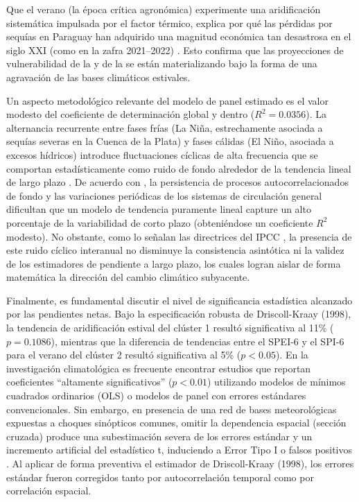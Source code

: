 \documentclass[11pt,a4paper]{article}
\begin{document}
Que el verano (la época crítica agronómica) experimente una aridificación sistemática impulsada por el factor térmico, explica por qué las pérdidas por sequías en Paraguay han adquirido una magnitud económica tan desastrosa en el siglo XXI (como en la zafra 2021--2022) \citep{enciso2022soja}. Esto confirma que las proyecciones de vulnerabilidad de la \citet{cepal2014} y de la \citet{secretaria2017} se están materializando bajo la forma de una agravación de las bases climáticos estivales.

Un aspecto metodológico relevante del modelo de panel estimado es el valor modesto del coeficiente de determinación global y dentro ($R^2 = 0.0356$). La alternancia recurrente entre fases frías (La Niña, estrechamente asociada a sequías severas en la Cuenca de la Plata) y fases cálidas (El Niño, asociada a excesos hídricos) introduce fluctuaciones cíclicas de alta frecuencia que se comportan estadísticamente como ruido de fondo alrededor de la tendencia lineal de largo plazo \citep{penalba2016}. De acuerdo con \citet{mudelsee2010}, la persistencia de procesos autocorrelacionados de fondo y las variaciones periódicas de los sistemas de circulación general dificultan que un modelo de tendencia puramente lineal capture un alto porcentaje de la variabilidad de corto plazo (obteniéndose un coeficiente $R^2$ modesto). No obstante, como lo señalan las directrices del IPCC \citep{stocker_climate_2013}, la presencia de este ruido cíclico interanual no disminuye la consistencia asintótica ni la validez de los estimadores de pendiente a largo plazo, los cuales logran aislar de forma matemática la dirección del cambio climático subyacente.

Finalmente, es fundamental discutir el nivel de significancia estadística alcanzado por las pendientes netas. Bajo la especificación robusta de Driscoll-Kraay (1998), la tendencia de aridificación estival del clúster 1 resultó significativa al 11\% ($p = 0.1086$), mientras que la diferencia de tendencias entre el SPEI-6 y el SPI-6 para el verano del clúster 2 resultó significativa al 5\% ($p < 0.05$). En la investigación climatológica es frecuente encontrar estudios que reportan coeficientes ``altamente significativos'' ($p < 0.01$) utilizando modelos de mínimos cuadrados ordinarios (OLS) o modelos de panel con errores estándares convencionales. Sin embargo, en presencia de una red de bases meteorológicas expuestas a choques sinópticos comunes, omitir la dependencia espacial (sección cruzada) produce una subestimación severa de los errores estándar y un incremento artificial del estadístico t, induciendo a Error Tipo I o falsos positivos \citep{wooldridge2010}. Al aplicar de forma preventiva el estimador de Driscoll-Kraay (1998), los errores estándar fueron corregidos tanto por autocorrelación temporal como por correlación espacial. 
\end{document}
